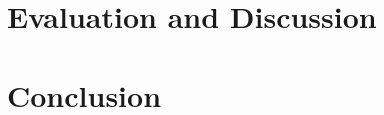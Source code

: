 \documentclass[a4paper,11pt]{article}
\begin{document}

\newpage

\section{Evaluation and Discussion} %
\label{sec:evaluation_and_discussion}


\newpage

\section{Conclusion} %
\label{sec:conclusion}


\newpage                            %



\end{document}
